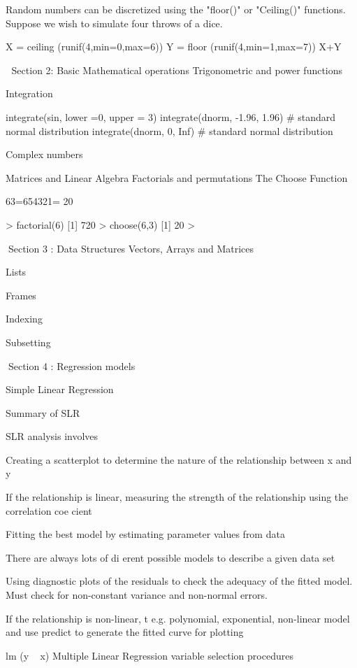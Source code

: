 Random numbers can be discretized using the "floor()" or "Ceiling()" functions. Suppose we wish to simulate four throws of a dice.

X = ceiling (runif(4,min=0,max=6))
Y = floor (runif(4,min=1,max=7))
X+Y


Section 2: Basic Mathematical operations
Trigonometric and power functions

Integration

integrate(sin, lower =0, upper = 3)
integrate(dnorm, -1.96, 1.96)					 # standard normal distribution
integrate(dnorm, 0, Inf)							   # standard normal distribution

Complex numbers 

Matrices and Linear Algebra
Factorials and permutations
The Choose Function

63=654321= 20



> factorial(6)
[1] 720
> choose(6,3)
[1] 20
> 




Section 3 : Data Structures
Vectors, Arrays and Matrices

Lists

Frames

Indexing

Subsetting

Section 4 : Regression models

Simple Linear Regression


Summary of SLR


SLR analysis involves

Creating a scatterplot to determine the nature of the relationship between x and y

If the relationship is linear, measuring the strength of the relationship using the correlation coe cient

Fitting the best model by estimating parameter values from data

There are always lots of di erent possible models to describe a given data set

Using diagnostic plots of the residuals to check the adequacy of the fitted model. Must check for non-constant variance and non-normal errors.

If the relationship is non-linear, t e.g. polynomial, exponential, non-linear model and use predict to generate the fitted curve for plotting



lm (y ~ x)
Multiple Linear Regression
variable selection procedures

